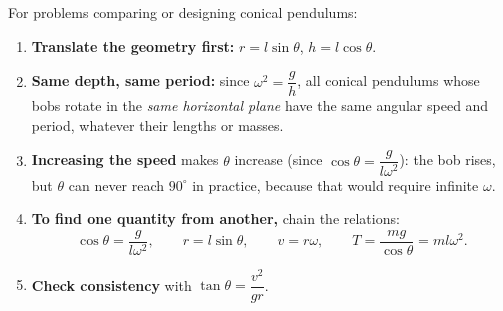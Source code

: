 \documentclass[11pt]{article}
\begin{document}
\begin{methode}[Using the relationships $\omega^2 = g/h$ and $v = \sqrt{gr\tan\theta}$]
For problems comparing or designing conical pendulums:
\begin{enumerate}
\item \textbf{Translate the geometry first:} $r = l\sin\theta$, $h = l\cos\theta$.
\item \textbf{Same depth, same period:} since $\omega^2 = \dfrac{g}{h}$, all conical pendulums whose bobs rotate in the \emph{same horizontal plane} have the same angular speed and period, whatever their lengths or masses.
\item \textbf{Increasing the speed} makes $\theta$ increase (since $\cos\theta = \dfrac{g}{l\omega^2}$): the bob rises, but $\theta$ can never reach $90^{\circ}$ in practice, because that would require infinite $\omega$.
\item \textbf{To find one quantity from another,} chain the relations:
\[ \cos\theta = \frac{g}{l\omega^2}, \qquad r = l\sin\theta, \qquad v = r\omega, \qquad T = \frac{mg}{\cos\theta} = ml\omega^2. \]
\item \textbf{Check consistency} with $\tan\theta = \dfrac{v^2}{gr}$.
\end{enumerate}
\end{methode}
\end{document}
